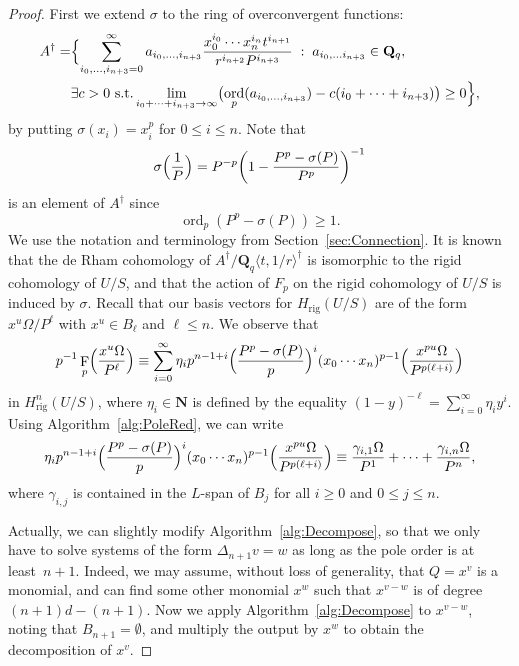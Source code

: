 \documentclass[a4paper,11pt]{article}
\numberwithin{equation}{section}
\newcommand{\NN}{\mathbf{N}} %
\newcommand{\QQ}{\mathbf{Q}} %
\DeclareMathOperator{\ord}{ord}          %
\DeclareMathOperator{\Frob}{F}           %
\providecommand{\Hrig}{H_{\text{rig}}}  %
\theoremstyle{definition}
\begin{document}
\begin{proof}
First we extend $\sigma$ to the ring of overconvergent functions:
\begin{align*}
A^{\dag} =
&\Bigl\{ \sum_{i_0,\dotsc,i_{n+3}=0}^{\infty} a_{i_0, \dotsc, i_{n+3}} 
\frac{x_0^{i_0} \dotsm x_n^{i_{n}}t^{i_{n+1}}}{r^{i_{n+2}} P^{i_{n+3}}} \; : \;
a_{i_0, \dotsc i_{n+3}} \in \QQ_q, \; \\ 
&\exists c > 0 \text{ s.t.} \lim_{i_0+\dotsb+i_{n+3} \rightarrow \infty} \bigl(\ord_p(a_{i_0, \dotsc, i_{n+3}} ) - 
c(i_0+\dotsb+i_{n+3})\bigr) \geq 0 \Bigr\},
\end{align*}
by putting $\sigma(x_i) = x_i^p$ for $0 \leq i \leq n$. Note that
\begin{equation*}
\sigma\Bigl(\frac{1}{P}\Bigr) = 
    P^{-p} \biggl( 1-\frac{P^p-\sigma(P)}{P^p} \biggr)^{-1}
\end{equation*}
is an element of $A^{\dag}$ since 
\begin{equation*}
\ord_p(P^p-\sigma(P)) \geq 1.
\end{equation*}
We use the notation and terminology from Section~\ref{sec:Connection}.
It is known that the de Rham cohomology of 
$A^{\dag}/\QQ_q \langle t,1/r \rangle^{\dag}$ 
is isomorphic to the rigid cohomology of $U/S$, and that the action of 
$F_p$ on the rigid cohomology of $U/S$ is induced by $\sigma$. Recall
that our basis vectors for $\Hrig(U/S)$ 
are of the form $x^u \Omega / P^{\ell}$ with $x^u \in B_{\ell}$ and 
$\ell \leq n$.  We observe that
\begin{equation*}
p^{-1} \Frob_p \Bigl(\frac{x^u \Omega}{P^{\ell}} \Bigr) \equiv
\sum_{i=0}^{\infty} \eta_i p^{n-1+i} \Bigl(\frac{P^p-\sigma(P)}{p} \Bigr)^i 
(x_0 \dotsm x_n)^{p-1} \Bigl( \frac{x^{pu} \Omega}{P^{p(\ell+i)}} \Bigr)
\end{equation*}
in $\Hrig^n(U/S)$, where $\eta_i \in \NN$ is defined by the equality 
$(1-y)^{-\ell} = \sum_{i=0}^{\infty} \eta_i y^i$.
Using Algorithm~\ref{alg:PoleRed}, we can write
\begin{equation} \label{eqn:Froblift}
\eta_i p^{n-1+i} \Bigl(\frac{P^p-\sigma(P)}{p} \Bigr)^i 
(x_0 \dotsm x_n)^{p-1} \Bigl( \frac{x^{pu} \Omega}{P^{p(\ell+i)}} \Bigr) \equiv
\frac{\gamma_{i,1} \Omega}{P^1}+\dotsb+\frac{\gamma_{i,n} \Omega}{P^n},
\end{equation}
where $\gamma_{i,j}$ is contained in the $L$-span of $B_j$ for all $i \geq 0$ and 
$0 \leq j \leq n$. 

Actually, we can slightly modify 
Algorithm~\ref{alg:Decompose}, so that we only have to solve systems of the 
form $\Delta_{n+1} v = w$ as long as the pole order is at least~$n+1$.  
Indeed, we may assume, without loss of generality, that $Q=x^v$ is a monomial, 
and can find some other monomial $x^w$ such that $x^{v-w}$ is of degree 
$(n+1)d-(n+1)$. Now we apply Algorithm~\ref{alg:Decompose} to $x^{v-w}$, 
noting that $B_{n+1}=\emptyset$, and multiply the output by $x^w$ to obtain 
the decomposition of $x^v$. 


\end{proof}
\end{document}
